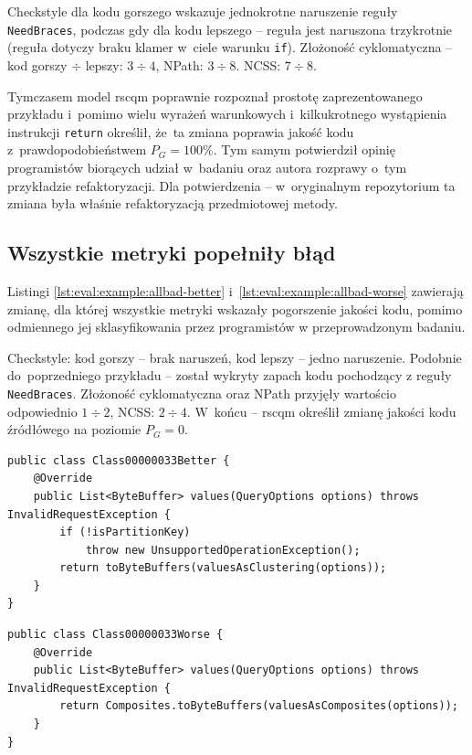 \documentclass[twoside]{praca}
\begin{document}
Checkstyle dla kodu gorszego wskazuje jednokrotne naruszenie reguły \texttt{NeedBraces}, podczas gdy dla kodu lepszego -- reguła jest naruszona trzykrotnie (reguła dotyczy braku klamer w~ciele warunku \texttt{if}). Złożoność cyklomatyczna -- kod gorszy $\div$ lepszy: $3\div4$, NPath: $3\div8$. NCSS: $7\div8$. 

Tymczasem model \gls{rscqm} poprawnie rozpoznał prostotę zaprezentowanego przykładu i~pomimo wielu wyrażeń warunkowych i~kilkukrotnego wystąpienia instrukcji \texttt{return} określił, że~ta zmiana poprawia jakość kodu z~prawdopodobieństwem $P_G=100\%$. Tym samym potwierdził opinię programistów biorących udział w~badaniu oraz autora rozprawy o~tym przykładzie refaktoryzacji. Dla potwierdzenia -- w~oryginalnym repozytorium ta zmiana była właśnie refaktoryzacją przedmiotowej metody.

\subsection{Wszystkie metryki popełniły błąd}

Listingi \ref{lst:eval:example:allbad-better} i~\ref{lst:eval:example:allbad-worse} zawierają zmianę, dla której wszystkie metryki wskazały pogorszenie jakości kodu, pomimo odmiennego jej sklasyfikowania przez programistów w przeprowadzonym badaniu.

Checkstyle: kod gorszy -- brak naruszeń, kod lepszy -- jedno naruszenie. Podobnie do~poprzedniego przykładu -- został wykryty zapach kodu pochodzący z reguły \texttt{NeedBraces}. Złożoność cyklomatyczna oraz NPath przyjęły wartościo odpowiednio $1\div2$, NCSS: $2\div4$. W~końcu -- \gls{rscqm} określił zmianę jakości kodu źródłówego na poziomie $P_G=0$.

\pagebreak

\begin{lstlisting}[frame=single,caption={Wszystkie metryki popełniły błąd -- przykład kodu -- wersja lepsza według programistów},captionpos=b,label={lst:eval:example:allbad-better}]
public class Class00000033Better {
    @Override
    public List<ByteBuffer> values(QueryOptions options) throws InvalidRequestException {
        if (!isPartitionKey)
            throw new UnsupportedOperationException();
        return toByteBuffers(valuesAsClustering(options));
    }
}
\end{lstlisting}

\begin{lstlisting}[frame=single,caption={Wszystkie metryki popełniły błąd -- przykład kodu -- wersja gorsza według programistów},captionpos=b,label={lst:eval:example:allbad-worse}]
public class Class00000033Worse {
    @Override
    public List<ByteBuffer> values(QueryOptions options) throws InvalidRequestException {
        return Composites.toByteBuffers(valuesAsComposites(options));
    }
}
\end{lstlisting}
\end{document}
